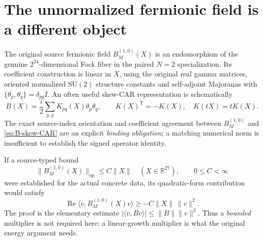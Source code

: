 \section{The unnormalized fermionic field is a different object}
The original source fermionic field \(B_M^{(1,0)}(X)\) is an
endomorphism of the genuine \(2^{24}\)-dimensional Fock fiber in the
paired \(N=2\) specialization. Its coefficient construction is linear in
\(X\), using the original real gamma matrices, oriented normalized
\(\mathrm{SU}(2)\) structure constants and self-adjoint Majoranas with
\(\{\theta_p,\theta_q\}=\delta_{pq}I\). An often useful skew-CAR
representation is schematically
\begin{equation}\label{eq:B-skew-CAR}
 B(X)=\frac{i}{2}\sum_{p,q}K_{pq}(X)\theta_p\theta_q,
 \qquad K(X)^\mathsf T=-K(X), \quad K(tX)=tK(X).
\end{equation}
The exact source-index orientation and coefficient agreement between
\(B_M^{(1,0)}\) and \eqref{eq:B-skew-CAR} are an explicit \emph{binding
obligation}; a matching numerical norm is insufficient to establish the
signed operator identity.

If a source-typed bound
\begin{equation}\label{eq:B-linear-target}
 \|B_M^{(1,0)}(X)\|_{\mathrm{op}}\le C\|X\|
 \quad(X\in\mathbb R^{27}),\qquad 0\le C<\infty
\end{equation}
were established for the actual concrete data, its quadratic-form
contribution would satisfy
\begin{equation}\label{eq:B-negative}
 \operatorname{Re}\langle v,B_M^{(1,0)}(X)v\rangle
 \ge -C\|X\|\,\|v\|^2.
\end{equation}
The proof is the elementary estimate
\(|\langle v,Bv\rangle|\le\|B\|\|v\|^2\).
Thus a \emph{bounded} multiplier is not required here: a linear-growth
multiplier is what the original energy argument needs.

